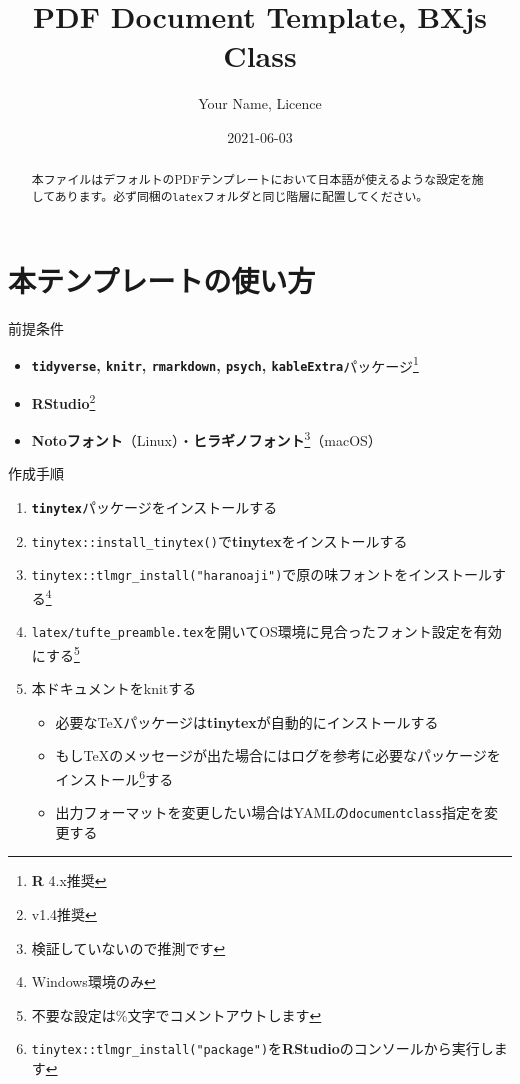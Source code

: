 \documentclass[
  12pt,
  a4paper,
  xelatex,
  ja=standard]{bxjsarticle}
\title{PDF Document Template, BXjs Class}
\author{Your Name, Licence}
\date{2021-06-03}
\providecommand{\tightlist}{%
  \setlength{\itemsep}{0pt}\setlength{\parskip}{0pt}}
\begin{document}
\maketitle
\begin{abstract}
本ファイルはデフォルトのPDFテンプレートにおいて日本語が使えるような設定を施してあります。必ず同梱の\texttt{latex}フォルダと同じ階層に配置してください。
\end{abstract}

\hypertarget{ux672cux30c6ux30f3ux30d7ux30ecux30fcux30c8ux306eux4f7fux3044ux65b9}{%
\section{本テンプレートの使い方}\label{ux672cux30c6ux30f3ux30d7ux30ecux30fcux30c8ux306eux4f7fux3044ux65b9}}

前提条件

\begin{itemize}
\tightlist
\item
  \textbf{\texttt{tidyverse}, \texttt{knitr}, \texttt{rmarkdown},
  \texttt{psych}, \texttt{kableExtra}}パッケージ\footnote{\textbf{R}
    4.x推奨}
\item
  \textbf{RStudio}\footnote{v1.4推奨}
\item
  \textbf{Notoフォント}（Linux）・\textbf{ヒラギノフォント}\footnote{検証していないので推測です}（macOS）
\end{itemize}

作成手順

\begin{enumerate}
\def\labelenumi{\arabic{enumi}.}
\tightlist
\item
  \textbf{\texttt{tinytex}}パッケージをインストールする
\item
  \texttt{tinytex::install\_tinytex()}で\textbf{tinytex}をインストールする
\item
  \texttt{tinytex::tlmgr\_install("haranoaji")}で原の味フォントをインストールする\footnote{Windows環境のみ}
\item
  \texttt{latex/tufte\_preamble.tex}を開いてOS環境に見合ったフォント設定を有効にする\footnote{不要な設定は\%文字でコメントアウトします}
\item
  本ドキュメントをknitする

  \begin{itemize}
  \tightlist
  \item
    必要なTeXパッケージは\textbf{tinytex}が自動的にインストールする
  \item
    もしTeXのメッセージが出た場合にはログを参考に必要なパッケージをインストール\footnote{\texttt{tinytex::tlmgr\_install("package")}を\textbf{RStudio}のコンソールから実行します}する
  \item
    出力フォーマットを変更したい場合はYAMLの\texttt{documentclass}指定を変更する
  \end{itemize}
\end{enumerate}
\end{document}
